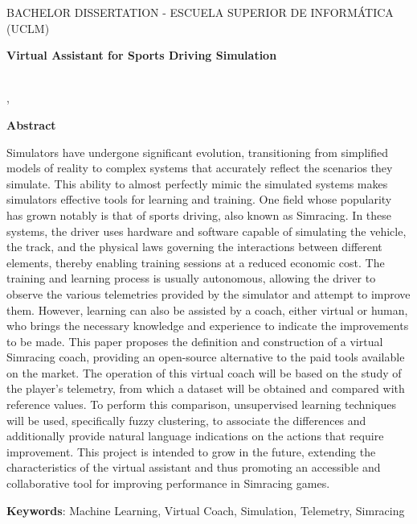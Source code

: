 \makeatletter
\begin{center} %
   {\textsc{BACHELOR DISSERTATION - ESCUELA SUPERIOR DE INFORMÁTICA 
   (UCLM)}\par}
   \vspace{1cm} %
   {\textbf{\Large Virtual Assistant for Sports Driving Simulation}\par}
   \vspace{0.4cm} %
   {\@autor \\ \@cityTF,{} \@monthTF{} \@yearTF\par} 
   \vspace{0.9cm} %
   {\textbf{\large\textsf{Abstract}}\par} 
\end{center}   
\makeatother %

Simulators have undergone significant evolution, transitioning from simplified models of reality to complex systems that accurately reflect the scenarios they simulate. This ability to almost perfectly mimic the simulated systems makes simulators effective tools for learning and training. One field whose popularity has grown notably is that of sports driving, also known as Simracing. In these systems, the driver uses hardware and software capable of simulating the vehicle, the track, and the physical laws governing the interactions between different elements, thereby enabling training sessions at a reduced economic cost.
The training and learning process is usually autonomous, allowing the driver to observe the various telemetries provided by the simulator and attempt to improve them. However, learning can also be assisted by a coach, either virtual or human, who brings the necessary knowledge and experience to indicate the improvements to be made.
This paper proposes the definition and construction of a virtual Simracing coach, providing an open-source alternative to the paid tools available on the market. The operation of this virtual coach will be based on the study of the player's telemetry, from which a dataset will be obtained and compared with reference values. To perform this comparison, unsupervised learning techniques will be used, specifically fuzzy clustering, to associate the differences and additionally provide natural language indications on the actions that require improvement.
This project is intended to grow in the future, extending the characteristics of the virtual assistant and thus promoting an accessible and collaborative tool for improving performance in Simracing games.

\bigskip 

\noindent\textbf{Keywords}: Machine Learning, Virtual Coach, Simulation, Telemetry, Simracing

\cleardoublepage %

